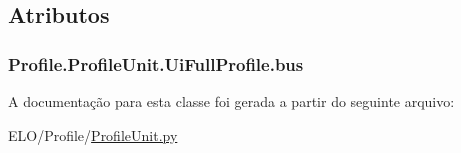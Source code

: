 \subsection{Atributos}
\hypertarget{classProfile_1_1ProfileUnit_1_1UiFullProfile_a47049f3f61c7fada93dd84fccd19a2bd}{
\subsubsection[{bus}]{\setlength{\rightskip}{0pt plus 5cm}Profile.\-Profile\-Unit.\-Ui\-Full\-Profile.\-bus}}\label{classProfile_1_1ProfileUnit_1_1UiFullProfile_a47049f3f61c7fada93dd84fccd19a2bd}


A documentação para esta classe foi gerada a partir do seguinte arquivo\-:\begin{DoxyCompactItemize}
\item 
E\-L\-O/\-Profile/\hyperlink{ProfileUnit_8py}{Profile\-Unit.\-py}\end{DoxyCompactItemize}
